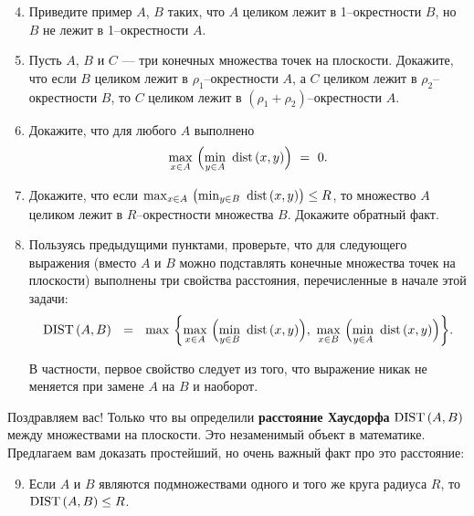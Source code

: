 \begin{enumerate}
\setcounter{enumi}{3}

\item Приведите пример $A$, $B$ таких, что $A$ целиком лежит в 1--окрестности $B$, но $B$ не лежит в 1--окрестности $A$.

\item Пусть $A$, $B$ и $C$ — три конечных множества точек на плоскости. Докажите, что если $B$ целиком лежит в $\rho_1$--окрестности $A$, а $C$ целиком лежит в $\rho_2$--окрестности $B$, то $C$ целиком лежит в $(\rho_1 + \rho_2)$--окрестности $A$.

\item Докажите, что для любого $A$ выполнено
\vspace{-0.2cm}
$$\max\limits_{x \in A}\ \Bigl(\min\limits_{y \in A}\ \mathrm{dist}\, (x,y)\Bigr)\ =\ 0.$$

\vspace{-0.35cm}
\item Докажите, что если $\max_{x \in A}\ \bigl(\min_{y \in B}\ \dist (x,y)\bigr) \leq R$, то множество $A$ целиком лежит в $R$--окрестности множества $B$. Докажите обратный факт.

\item Пользуясь предыдущими пунктами, проверьте, что для следующего выражения (вместо $A$ и $B$ можно подставлять конечные множества точек на плоскости) выполнены три свойства расстояния, перечисленные в начале этой задачи:
\vspace{-0.2cm}
$$\mathrm{DIST}\, (A,B)\ \ =\ \ \max\ \biggl\{\max\limits_{x \in A}\ \Bigl(\min\limits_{y \in B}\ \mathrm{dist}\, (x,y)\Bigr),
	\ \max\limits_{x \in B}\ \Bigl(\min\limits_{y \in A}\ \mathrm{dist}\, (x,y)\Bigr)\biggr\}.$$

\vspace{-0.2cm} В частности, первое свойство следует из того, что выражение никак не меняется при замене $A$ на $B$ и наоборот.
\end{enumerate}

\noindent Поздравляем вас! Только что вы определили {\bf расстояние Хаусдорфа} $\mathrm{DIST}\, (A,B)$ между множествами на плоскости. Это незаменимый объект в математике. Предлагаем вам доказать простейший, но очень важный факт про это расстояние:

\begin{enumerate}
\setcounter{enumi}{8}
\item Если $A$ и $B$ являются подмножествами одного и того же круга радиуса $R$, то $\mathrm{DIST}\, (A, B) \leq R$.
\end{enumerate}